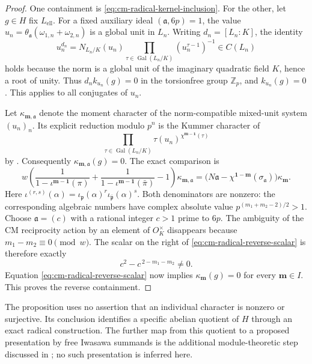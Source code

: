 \begin{proof}
One containment is \eqref{eq:cm-radical-kernel-inclusion}.
For the other, let \(g\in H\) fix \(L_{\mathrm{ell}}\).
For a fixed auxiliary ideal \((\mathfrak a,6p)=1\), the value
\(u_n=\theta_{\mathfrak a}(\omega_{1,n}+\omega_{2,n})\)
is a global unit in \(L_n\).
Writing \(d_n=[L_n:K]\), the identity
\[
 u_n^{d_n}
  =N_{L_n/K}(u_n)
       \prod_{\tau\in\operatorname{Gal}(L_n/K)}
                                (u_n^{\tau-1})^{-1}
                         \in C(L_n)
\]
holds because the norm is a global unit of the imaginary
quadratic field \(K\), hence a root of unity.
Thus \(d_n k_{u_n}(g)=0\) in the torsionfree group
\(\mathbb Z_p\), and \(k_{u_n}(g)=0\).
This applies to all conjugates of \(u_n\).

Let \(\kappa_{\boldsymbol m,\mathfrak a}\) denote the moment
character of the norm-compatible mixed-unit system \((u_n)_n\).
Its explicit reduction modulo \(p^n\) is the Kummer character of
\[
 \prod_{\tau\in\operatorname{Gal}(L_n/K)}
             \tau(u_n)^{\chi^{\boldsymbol m-\boldsymbol1}(\tau)}
\]
by \cite[Lemma 4.2, p.~17]{IshiiSoule}.
Consequently \(\kappa_{\boldsymbol m,\mathfrak a}(g)=0\).
The exact comparison
\cite[Proposition 4.3, pp.~17--18]{IshiiSoule} is
\begin{equation}\label{eq:cm-radical-reverse-scalar}
 w\left(\frac1{1-\iota^{\boldsymbol m-\boldsymbol1}(\pi)}
       +\frac1{1-\iota^{\boldsymbol m-\boldsymbol1}(\bar\pi)}
       -1\right)\kappa_{\boldsymbol m,\mathfrak a}
  =\bigl(N\mathfrak a-
           \chi^{\boldsymbol1-\boldsymbol m}(\sigma_{\mathfrak a})
    \bigr)\kappa_{\boldsymbol m}.
\end{equation}
Here
\(\iota^{(r,s)}(\alpha)=
 \iota_{\mathfrak p}(\alpha)^r
 \iota_{\bar{\mathfrak p}}(\alpha)^s\).
Both denominators are nonzero:
the corresponding algebraic numbers have complex absolute value
\(p^{(m_1+m_2-2)/2}>1\).
Choose \(\mathfrak a=(c)\) with a rational integer \(c>1\)
prime to \(6p\).
The ambiguity of the CM reciprocity action by an element of
\(O_K^\times\) disappears because
\(m_1-m_2\equiv0\pmod w\).
The scalar on the right of
\eqref{eq:cm-radical-reverse-scalar} is therefore exactly
\[
                 c^2-c^{\,2-m_1-m_2}\ne0.
\]
Equation \eqref{eq:cm-radical-reverse-scalar} now implies
\(\kappa_{\boldsymbol m}(g)=0\) for every
\(\boldsymbol m\in I\).
This proves the reverse containment.
\end{proof}

The proposition uses no assertion that an individual character is
nonzero or surjective.  Its conclusion identifies a specific
abelian quotient of \(H\) through an exact radical construction.
The further map from this quotient to a proposed presentation by
free Iwasawa summands is the additional module-theoretic step
discussed in \cite[Remark 4.9.1, p.~24]{Ishii}; no such
presentation is inferred here.

